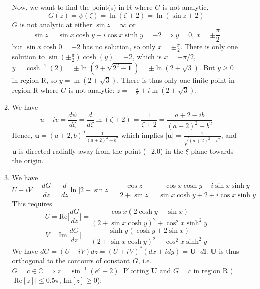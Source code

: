 \documentclass[a4paper]{article}
\begin{document}
\begin{ans}
\begin{enumerate}[label=(\alph*)]
\begin{enumerate}[label=(\roman*)]
\begin{center}
        \end{center}
Now, we want to find the point(s) in R where $G$ is not analytic.
$$G(z)=\psi(\zeta)=\ln(\zeta+2)=\ln(\sin z+2)$$
$G$ is not analytic at either $\sin z=\infty$ or
$$\sin z=\sin x\cosh y+i\cos x\sinh y=-2\implies y=0,~x=\pm\frac{\pi}{2}$$
but $\sin x\cosh0=-2$ has no solution, so only $x=\pm\frac{\pi}{2}$. There is only one solution to $\sin(\pm\frac{\pi}{2})\cosh(y)=-2$, which is $x=-\pi/2$, $y=\cosh^{-1}(2)=\pm\ln(2+\sqrt{2^2-1})=\pm\ln(2+\sqrt{3})$. But $y\geq0$ in region R, so $y=\ln(2+\sqrt{3})$. There is thus only one finite point in region R where $G$ is not analytic: $z=-\frac{\pi}{2}+i\ln(2+\sqrt{3})$.
\item We have
$$u-iv=\frac{d\psi}{d\zeta}=\frac{d}{d\zeta}\ln(\zeta+2)=\frac{1}{\zeta+2}=\frac{a+2-ib}{(a+2)^2+b^2}$$
Hence, $\mathbf{u}=(a+2,b)^T\frac{1}{(a+2)^2+b^2}$ which implies $|\mathbf{u}|=\frac{1}{\sqrt{(a+2)^2+b^2}}$, and $\mathbf{u}$ is directed radially away from the point ($-2$,0) in the $\xi$-plane towards the origin.
\item We have 
$$U-iV=\frac{dG}{dz}=\frac{d}{dz}\ln|2+\sin z|=\frac{\cos z}{2+\sin z}=\frac{\cos x\cosh y-i\sin x\sinh y}{\sin x \cosh y+2+i\cos x\sinh y}$$ This requires
$$U=\text{Re}\bigg[\frac{dG}{dz}\bigg]=\frac{\cos x(2\cosh y+\sin x)}{(2+\sin x\cosh y)^2+\cos^2x\sinh^2y}$$
$$V=\text{Im}\bigg[\frac{dG}{dz}\bigg]=\frac{\sinh y(\cosh y+2\sin x)}{(2+\sin x\cosh y)^2+\cos^2x\sinh^2y}$$
We have $dG=(U-iV)dz=(U+iV)^*(dx+idy)=\mathbf{U}\cdot d\mathbf{l}$. $\mathbf{U}$ is thus orthogonal to the contours of constant $G$, i.e. $G=c\in\mathbb{C}\implies z=\sin^{-1}(e^c-2)$. Plotting $\mathbf{U}$ and $G=c$ in region R ($|\text{Re}[z]|\leq 0.5\pi$, $\text{Im}[z]\geq 0$):

\end{enumerate}
\end{enumerate}
\end{ans}
\end{document}
